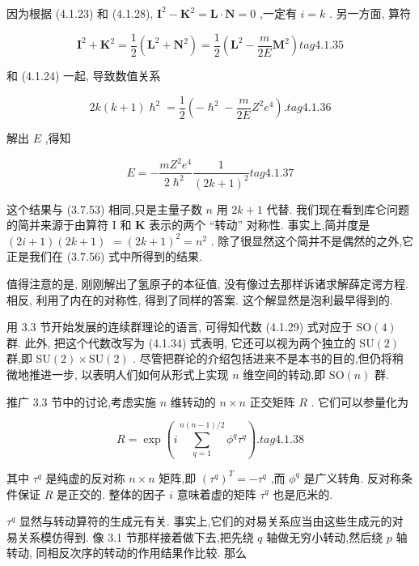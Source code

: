 因为根据 (4.1.23) 和 (4.1.28), ${\mathbf{I}}^{2} - {\mathbf{K}}^{2} = \mathbf{L} \cdot \mathbf{N} = 0$ ,一定有 $i = k$ . 另一方面, 算符

$$
{\mathbf{I}}^{2} + {\mathbf{K}}^{2} = \frac{1}{2}\left( {{\mathbf{L}}^{2} + {\mathbf{N}}^{2}}\right) = \frac{1}{2}\left( {{\mathbf{L}}^{2} - \frac{m}{2E}{\mathbf{M}}^{2}}\right) tag{4. 1.35}
$$

和 (4.1.24) 一起, 导致数值关系

$$
{2k}\left( {k + 1}\right) {\hslash }^{2} = \frac{1}{2}\left( {-{\hslash }^{2} - \frac{m}{2E}{Z}^{2}{e}^{4}}\right) . tag{4. 1.36}
$$

解出 $E$ ,得知

$$
E = - \frac{m{Z}^{2}{e}^{4}}{2{\hslash }^{2}}\frac{1}{{\left( 2k + 1\right) }^{2}} tag{4. 1.37}
$$

这个结果与 (3.7.53) 相同,只是主量子数 $n$ 用 ${2k} + 1$ 代替. 我们现在看到库仑问题的简并来源于由算符 I 和 $\mathbf{K}$ 表示的两个 “转动” 对称性. 事实上,简并度是 $\left( {{2i} + 1}\right) \left( {{2k} + 1}\right)$ $= {\left( 2k + 1\right) }^{2} = {n}^{2}$ . 除了很显然这个简并不是偶然的之外,它正是我们在 (3.7.56) 式中所得到的结果.

值得注意的是, 刚刚解出了氢原子的本征值, 没有像过去那样诉诸求解薛定谔方程. 相反, 利用了内在的对称性, 得到了同样的答案. 这个解显然是泡利最早得到的.

用 3.3 节开始发展的连续群理论的语言, 可得知代数 (4.1.29) 式对应于 $\mathrm{{SO}}\left( 4\right)$ 群. 此外, 把这个代数改写为 (4.1.34) 式表明, 它还可以视为两个独立的 $\mathrm{{SU}}\left( 2\right)$ 群,即 $\mathrm{{SU}}\left( 2\right) \times \mathrm{{SU}}\left( 2\right)$ . 尽管把群论的介绍包括进来不是本书的目的,但仍将稍微地推进一步, 以表明人们如何从形式上实现 $n$ 维空间的转动,即 $\mathrm{{SO}}\left( n\right)$ 群.

推广 3.3 节中的讨论,考虑实施 $n$ 维转动的 $n \times n$ 正交矩阵 $R$ . 它们可以参量化为

$$
R = \exp \left( {i\mathop{\sum }\limits_{{q = 1}}^{{n\left( {n - 1}\right) /2}}{\phi }^{q}{\tau }^{q}}\right) . tag{4. 1.38}
$$

其中 ${\tau }^{q}$ 是纯虚的反对称 $n \times n$ 矩阵,即 ${\left( {\tau }^{q}\right) }^{T} = - {\tau }^{q}$ ,而 ${\phi }^{q}$ 是广义转角. 反对称条件保证 $R$ 是正交的. 整体的因子 $i$ 意味着虚的矩阵 ${\tau }^{q}$ 也是厄米的.

${\tau }^{q}$ 显然与转动算符的生成元有关. 事实上,它们的对易关系应当由这些生成元的对易关系模仿得到. 像 3.1 节那样接着做下去,把先绕 $q$ 轴做无穷小转动,然后绕 $p$ 轴转动, 同相反次序的转动的作用结果作比较. 那么

